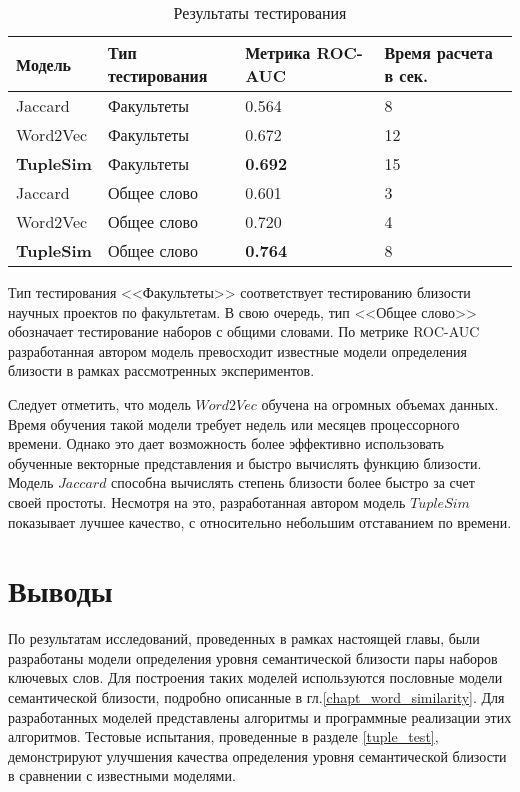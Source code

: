 \begin{table}[H]
\begin{tabularx}{16cm}{|X|X|X|X|} 
        \hline
        Модель & Тип тестирования & Метрика ROC-AUC &  Время расчета в сек. \\ \hline
        Jaccard & Факультеты &0.564 & 8 \\ \hline
        Word2Vec & Факультеты &0.672 & 12 \\ \hline
        \textbf{TupleSim} & Факультеты & \textbf{0.692} & 15 \\ \hline
        Jaccard & Общее слово & 0.601 & 3 \\ \hline
        Word2Vec & Общее слово & 0.720 & 4 \\ \hline
        \textbf{TupleSim} & Общее слово& \textbf{0.764} & 8 \\ \hline
\end{tabularx}
\caption{Результаты тестирования} \label{tbl:tuple_test}
\end{table}
Тип тестирования <<Факультеты>> соответствует тестированию близости научных проектов по факультетам. В свою очередь, тип <<Общее слово>> обозначает тестирование наборов с общими словами. По метрике ROC-AUC разработанная автором модель превосходит известные модели определения близости в рамках рассмотренных экспериментов.

Следует отметить, что модель $Word2Vec$ обучена на огромных объемах данных. Время обучения такой модели требует недель или месяцев процессорного времени. Однако это дает возможность более эффективно использовать обученные векторные представления и быстро вычислять функцию близости. Модель $Jaccard$ способна вычислять степень близости более быстро за счет своей простоты. Несмотря на это, разработанная автором модель $TupleSim$ показывает лучшее качество, с относительно небольшим отставанием по времени.

\section{Выводы}
По результатам исследований, проведенных в рамках настоящей главы, были разработаны модели определения уровня семантической близости пары наборов ключевых слов. Для построения таких моделей используются пословные модели семантической близости, подробно описанные в гл.\ref{chapt_word_similarity}. Для разработанных моделей представлены алгоритмы и программные реализации этих алгоритмов. Тестовые испытания, проведенные в разделе \ref{tuple_test}, демонстрируют улучшения качества определения уровня семантической близости в сравнении с известными моделями.

